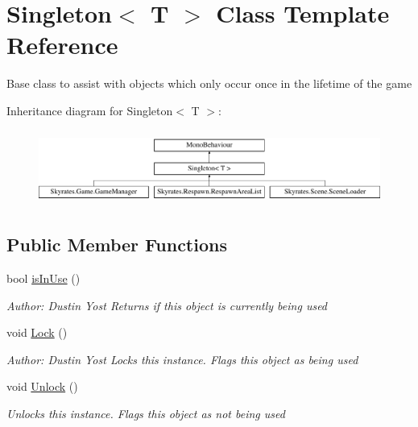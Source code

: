 \hypertarget{class_singleton_3_01_t_01_4}{\section{Singleton$<$ T $>$ Class Template Reference}
\label{class_singleton_3_01_t_01_4}
}


Base class to assist with objects which only occur once in the lifetime of the game  


Inheritance diagram for Singleton$<$ T $>$\-:\begin{figure}[H]
\begin{center}
\leavevmode
\includegraphics[height=2.477876cm]{class_singleton_3_01_t_01_4}
\end{center}
\end{figure}
\subsection*{Public Member Functions}
\begin{DoxyCompactItemize}
\item 
bool \hyperlink{class_singleton_3_01_t_01_4_aaf243fc3c85154c237fb3086b67ef6ff}{is\-In\-Use} ()
\begin{DoxyCompactList}\small\item\em Author\-: Dustin Yost Returns if this object is currently being used \end{DoxyCompactList}\item 
void \hyperlink{class_singleton_3_01_t_01_4_a93ff9802b7793e342ce7e64983a59a0d}{Lock} ()
\begin{DoxyCompactList}\small\item\em Author\-: Dustin Yost Locks this instance. Flags this object as being used \end{DoxyCompactList}\item 
void \hyperlink{class_singleton_3_01_t_01_4_a4832d0cc115af2e3fe38947538f17dee}{Unlock} ()
\begin{DoxyCompactList}\small\item\em Unlocks this instance. Flags this object as not being used \end{DoxyCompactList}\end{DoxyCompactItemize}

